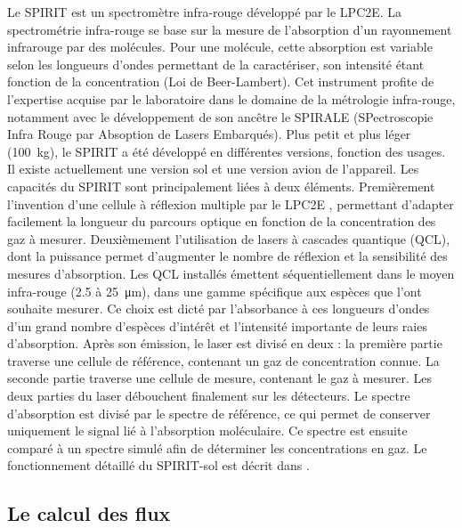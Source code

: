 Le SPIRIT est un spectromètre infra-rouge développé par le LPC2E.
La spectrométrie infra-rouge se base sur la mesure de l'absorption d'un rayonnement infrarouge par des molécules.
Pour une molécule, cette absorption est variable selon les longueurs d'ondes permettant de la caractériser, son intensité étant fonction de la concentration (Loi de Beer-Lambert).
Cet instrument profite de l'expertise acquise par le laboratoire dans le domaine de la métrologie infra-rouge, notamment avec le développement de son ancêtre le SPIRALE (SPectroscopie Infra Rouge par Absoption de Lasers Embarqués).
Plus petit et plus léger (\SI{100}{\kilo\gram}), le SPIRIT a été développé en différentes versions, fonction des usages.
Il existe actuellement une version sol et une version avion de l'appareil.
Les capacités du SPIRIT sont principalement liées à deux éléments.
Premièrement l'invention d'une cellule à réflexion multiple par le LPC2E \citep{robert2007}, permettant d'adapter facilement la longueur du parcours optique en fonction de la concentration des gaz à mesurer.
Deuxièmement l'utilisation de lasers à cascades quantique (QCL), dont la puissance permet d'augmenter le nombre de réflexion et la sensibilité des mesures d'absorption.
Les QCL installés émettent séquentiellement dans le moyen infra-rouge (\num{2.5} à \SI{25}{\micro\metre}), dans une gamme spécifique aux espèces que l'ont souhaite mesurer.
Ce choix est dicté par l'absorbance à ces longueurs d'ondes d'un grand nombre d'espèces d'intérêt et l'intensité importante de leurs raies d'absorption.
Après son émission, le laser est divisé en deux : 
la première partie traverse une cellule de référence, contenant un gaz de concentration connue.
La seconde partie traverse une cellule de mesure, contenant le gaz à mesurer.
Les deux parties du laser débouchent finalement sur les détecteurs.
Le spectre d'absorption est divisé par le spectre de référence, ce qui permet de conserver uniquement le signal lié à l'absorption moléculaire. Ce spectre est ensuite comparé à un spectre simulé afin de déterminer les concentrations en gaz.
Le fonctionnement détaillé du SPIRIT-sol est décrit dans \cite{guimbaud2011}.


\subsection{Le calcul des flux}

